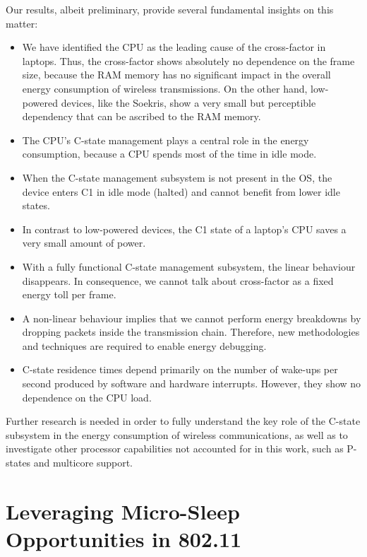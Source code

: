 \documentclass[twoside,nohyper]{tufte-book}
\providecommand{\tightlist}{%
  \setlength{\itemsep}{0pt}\setlength{\parskip}{0pt}}
\theoremstyle{definition}
\theoremstyle{definition}
\theoremstyle{definition}
\theoremstyle{remark}
\begin{document}
Our
results\cite[0pt]{contrib-04a,contrib-04b},
albeit preliminary, provide several fundamental insights on this matter:

\begin{itemize}
\tightlist
\item
  We have identified the CPU as the leading cause of the cross-factor in
  laptops. Thus, the cross-factor shows absolutely no dependence on the
  frame size, because the RAM memory has no significant impact in the
  overall energy consumption of wireless transmissions. On the other
  hand, low-powered devices, like the Soekris, show a very small but
  perceptible dependency that can be ascribed to the RAM memory.
\item
  The CPU's C-state management plays a central role in the energy
  consumption, because a CPU spends most of the time in idle mode.
\item
  When the C-state management subsystem is not present in the OS, the
  device enters C1 in idle mode (halted) and cannot benefit from lower
  idle states.
\item
  In contrast to low-powered devices, the C1 state of a laptop's CPU
  saves a very small amount of power.
\item
  With a fully functional C-state management subsystem, the linear
  behaviour disappears. In consequence, we cannot talk about
  cross-factor as a fixed energy toll per frame.
\item
  A non-linear behaviour implies that we cannot perform energy
  breakdowns by dropping packets inside the transmission chain.
  Therefore, new methodologies and techniques are required to enable
  energy debugging.
\item
  C-state residence times depend primarily on the number of wake-ups per
  second produced by software and hardware interrupts. However, they
  show no dependence on the CPU load.
\end{itemize}

Further research is needed in order to fully understand the key role of
the C-state subsystem in the energy consumption of wireless
communications, as well as to investigate other processor capabilities
not accounted for in this work, such as P-states and multicore support.

\hypertarget{ch:05}{%
\chapter{Leveraging Micro-Sleep Opportunities in 802.11}\label{ch:05}}
\end{document}
